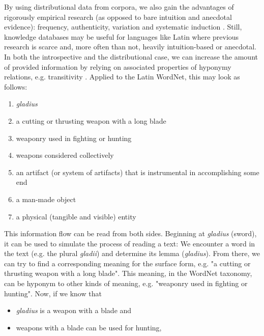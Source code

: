 \label{transitivity}
By using distributional data from corpora, we also gain the advantages of rigorously empirical research (as opposed to bare intuition and anecdotal evidence): frequency, authenticity, variation and systematic induction \parencite[60]{griesBehavioralProfilesCorpusbased2009}. Still, knowledge databases may be useful for languages like Latin where previous research is scarce and, more often than not, heavily intuition-based or anecdotal. In both the introspective and the distributional case, we can increase the amount of provided information by relying on associated properties of hyponymy relations, e.g. transitivity \parencite[58]{coenenAnalogieUndMetapher2013}. Applied to the Latin WordNet, this may look as follows:
\begin{enumerate}
         \item \textit{gladius}
         \item a cutting or thrusting weapon with a long blade
         \item weaponry used in fighting or hunting
         \item weapons considered collectively
         \item an artifact (or system of artifacts) that is instrumental in accomplishing some end
         \item a man-made object
         \item a physical (tangible and visible) entity
\end{enumerate}
This information flow can be read from both sides. Beginning at \textit{gladius} (sword), it can be used to simulate the process of reading a text: We encounter a word in the text (e.g. the plural \textit{gladii}) and determine its lemma (\textit{gladius}). From there, we can try to find a corresponding meaning for the surface form, e.g. "a cutting or thrusting weapon with a long blade". This meaning, in the WordNet taxonomy, can be hyponym to other kinds of meaning, e.g. "weaponry used in fighting or hunting". Now, if we know that
\begin{itemize}
         \item \textit{gladius} is a weapon with a blade and
         \item weapons with a blade can be used for hunting,
\end{itemize}
